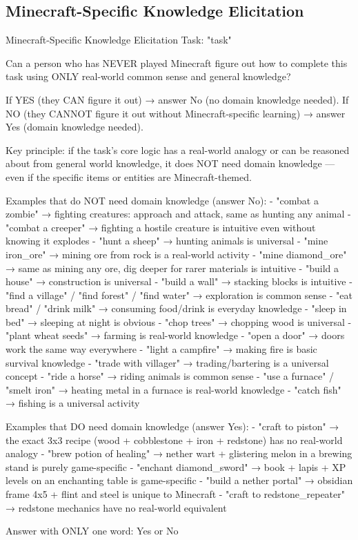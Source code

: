 \documentclass[11pt]{article}
\begin{document}
\subsection{Minecraft-Specific Knowledge Elicitation}
\label{appendix: Minecraft-Specific Knowledge Elicitation}
\begin{center}
\centering
\begin{widepromptbox}{Minecraft-Specific Knowledge Elicitation}
Task: "{task}"

Can a person who has NEVER played Minecraft figure out how to complete this task using ONLY real-world common sense and general knowledge?

If YES (they CAN figure it out) → answer No (no domain knowledge needed).
If NO (they CANNOT figure it out without Minecraft-specific learning) → answer Yes (domain knowledge needed).

Key principle: if the task's core logic has a real-world analogy or can be reasoned about from general world knowledge, it does NOT need domain knowledge — even if the specific items or entities are Minecraft-themed.

Examples that do NOT need domain knowledge (answer No):
- "combat a zombie" → fighting creatures: approach and attack, same as hunting any animal
- "combat a creeper" → fighting a hostile creature is intuitive even without knowing it explodes
- "hunt a sheep" → hunting animals is universal
- "mine iron_ore" → mining ore from rock is a real-world activity
- "mine diamond_ore" → same as mining any ore, dig deeper for rarer materials is intuitive
- "build a house" → construction is universal
- "build a wall" → stacking blocks is intuitive
- "find a village" / "find forest" / "find water" → exploration is common sense
- "eat bread" / "drink milk" → consuming food/drink is everyday knowledge
- "sleep in bed" → sleeping at night is obvious
- "chop trees" → chopping wood is universal
- "plant wheat seeds" → farming is real-world knowledge
- "open a door" → doors work the same way everywhere
- "light a campfire" → making fire is basic survival knowledge
- "trade with villager" → trading/bartering is a universal concept
- "ride a horse" → riding animals is common sense
- "use a furnace" / "smelt iron" → heating metal in a furnace is real-world knowledge
- "catch fish" → fishing is a universal activity

Examples that DO need domain knowledge (answer Yes):
- "craft to piston" → the exact 3x3 recipe (wood + cobblestone + iron + redstone) has no real-world analogy
- "brew potion of healing" → nether wart + glistering melon in a brewing stand is purely game-specific
- "enchant diamond_sword" → book + lapis + XP levels on an enchanting table is game-specific
- "build a nether portal" → obsidian frame 4x5 + flint and steel is unique to Minecraft
- "craft to redstone_repeater" → redstone mechanics have no real-world equivalent

Answer with ONLY one word: Yes or No
\end{widepromptbox}    
\end{center}
\end{document}
